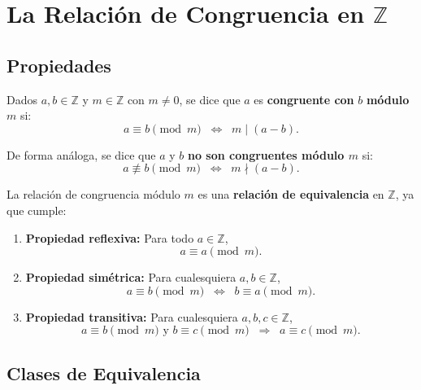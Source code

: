 \documentclass[a4paper,12pt]{article}
\begin{document}

\section{La Relación de Congruencia en \(\mathbb{Z}\)}

\subsection{Propiedades}

\begin{procedimiento}[title={Definición de congruencia módulo \(m\)}]
Dados \(a,b \in \mathbb{Z}\) y \(m \in \mathbb{Z}\) con \(m \neq 0\), se dice que \(a\) es \textbf{congruente con} \(b\) \textbf{módulo \(m\)} si:
\[
a \equiv b \pmod{m} \;\;\Longleftrightarrow\;\; m \mid (a - b).
\]

De forma análoga, se dice que \(a\) y \(b\) \textbf{no son congruentes módulo \(m\)} si:
\[
a \not\equiv b \pmod{m} \;\;\Longleftrightarrow\;\; m \nmid (a - b).
\]
\end{procedimiento}

\begin{procedimiento}[title={Relación de equivalencia}]
La relación de congruencia módulo \(m\) es una \textbf{relación de equivalencia} en \(\mathbb{Z}\), ya que cumple:

\begin{enumerate}
    \item \textbf{Propiedad reflexiva:}  
    Para todo \(a \in \mathbb{Z}\),
    \[
    a \equiv a \pmod{m}.
    \]

    \item \textbf{Propiedad simétrica:}  
    Para cualesquiera \(a,b \in \mathbb{Z}\),
    \[
    a \equiv b \pmod{m} \;\;\Longleftrightarrow\;\; b \equiv a \pmod{m}.
    \]

    \item \textbf{Propiedad transitiva:}  
    Para cualesquiera \(a,b,c \in \mathbb{Z}\),
    \[
    a \equiv b \pmod{m} \text{ y } b \equiv c \pmod{m} \;\;\Longrightarrow\;\; a \equiv c \pmod{m}.
    \]
\end{enumerate}
\end{procedimiento}

\subsection{Clases de Equivalencia}
\end{document}
